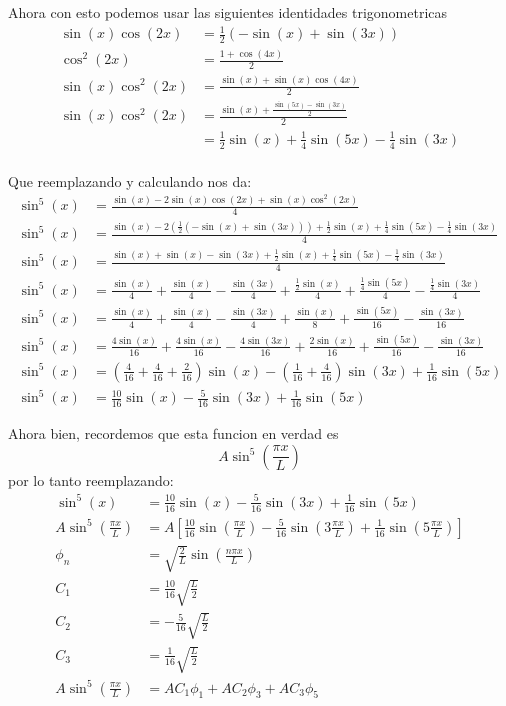 \documentclass{report}
\begin{document}
Ahora con esto podemos usar las siguientes identidades trigonometricas
\begin{align*}
\sin(x)\cos(2x) &= \frac{1}{2}\left(- \sin(x) + \sin(3x)\right)\\
  \cos^2(2x) &= \frac{1 + \cos(4x)}{2}\\
  \sin(x)\cos^2(2x) &= \frac{\sin(x) + \sin(x)\cos(4x)}{2}\\
  \sin(x)\cos^2(2x) &= \frac{\sin(x) + \frac{\sin(5x) - \sin(3x)}{2}}{2}\\
  &= \frac{1}{2}\sin(x) + \frac{1}{4}\sin(5x) - \frac{1}{4}\sin(3x)\\
\end{align*}

Que reemplazando y calculando nos da:
\begin{align*}
  \sin^5(x) &= \frac{\sin(x) - 2\sin(x)\cos(2x) + \sin(x)\cos^2(2x)}{4}\\
  \sin^5(x) &= \frac{\sin(x) - 2\left(\frac{1}{2}\left(-\sin(x) + \sin(3x)\right) \right) + \frac{1}{2}\sin(x) + \frac{1}{4}\sin(5x) - \frac{1}{4}\sin(3x)}{4}\\
  \sin^5(x) &= \frac{\sin(x) + \sin(x) - \sin(3x) + \frac{1}{2}\sin(x) + \frac{1}{4}\sin(5x) - \frac{1}{4}\sin(3x)}{4}\\
  \sin^5(x) &= \frac{\sin(x)}{4} + \frac{\sin(x)}{4} - \frac{\sin(3x)}{4} + \frac{\frac{1}{2}\sin(x)}{4} + \frac{\frac{1}{4}\sin(5x)}{4} - \frac{\frac{1}{4}\sin(3x)}{4}\\
  \sin^5(x) &= \frac{\sin(x)}{4} + \frac{\sin(x)}{4} - \frac{\sin(3x)}{4} + \frac{\sin(x)}{8} + \frac{\sin(5x)}{16} - \frac{\sin(3x)}{16}\\
  \sin^5(x) &= \frac{4\sin(x)}{16} + \frac{4\sin(x)}{16} - \frac{4\sin(3x)}{16} + \frac{2\sin(x)}{16} + \frac{\sin(5x)}{16} - \frac{\sin(3x)}{16}\\
  \sin^5(x) &= \left( \frac{4}{16} + \frac{4}{16} + \frac{2}{16}\right)\sin(x) - \left( \frac{1}{16} + \frac{4}{16}\right)\sin(3x) + \frac{1}{16} \sin(5x)\\
  \sin^5(x) &= \frac{10}{16}\sin(x) - \frac{5}{16}\sin(3x) + \frac{1}{16} \sin(5x)
\end{align*}

Ahora bien, recordemos que esta funcion en verdad es \[A \sin^5\left(\frac{\pi x}{L}\right)\] por lo tanto reemplazando:
\begin{align*}
  \sin^5(x) &= \frac{10}{16}\sin(x) - \frac{5}{16}\sin(3x) + \frac{1}{16} \sin(5x)\\
  A \sin^5\left(\frac{\pi x}{L}\right) &= A\left[\frac{10}{16}\sin\left(\frac{\pi x}{L}\right) - \frac{5}{16}\sin\left(3\frac{\pi x}{L}\right) + \frac{1}{16} \sin\left(5\frac{\pi x}{L}\right)\right]\\
  \phi_n &= \sqrt{\frac{2}{L}} \sin\left(\frac{n \pi x}{L}\right)\\
  C_1 &= \frac{10}{16}\sqrt{\frac{L}{2}} \\
  C_2 &= -\frac{5}{16}\sqrt{\frac{L}{2}} \\
  C_3 &= \frac{1}{16}\sqrt{\frac{L}{2}} \\
  A \sin^5\left(\frac{\pi x}{L}\right) &= AC_1\phi_1 + AC_2\phi_3 + AC_3\phi_5
\end{align*}
\end{document}
